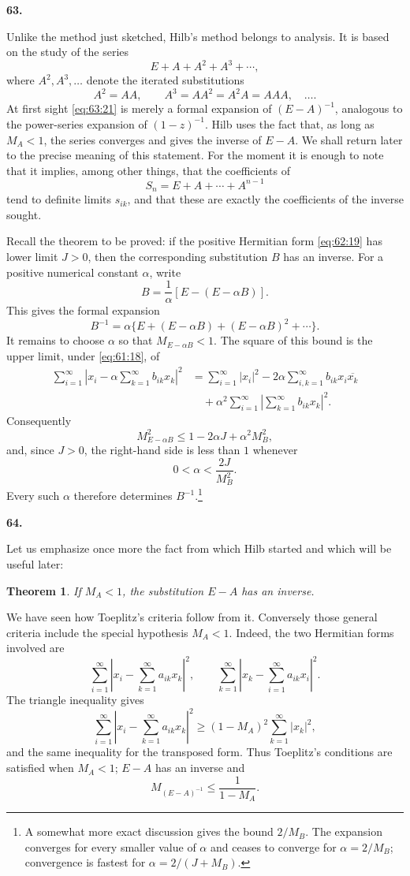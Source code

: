 \documentclass[
  paper=b5,
  fontsize=13pt,
  twoside=true,
  open=any,
  bookmarkpackage=false,
  chapterprefix=true,
  headings=normal
]{scrbook}
\newtheorem*{theorem}{Theorem}
\theoremstyle{definition}
\newcommand{\numberedparagraph}[1]{%
  \par\medskip\phantomsection\label{sec:#1}%
  \noindent\textbf{#1.}\enspace
}
\begin{document}
\numberedparagraph{63}
Unlike the method just sketched, Hilb's method belongs to analysis. It is
based on the study of the series
\begin{equation}
  E+A+A^2+A^3+\cdots,
  \tag{21}\label{eq:63:21}
\end{equation}
where $A^2,A^3,\ldots$ denote the iterated substitutions
\[
 A^2=AA,\qquad A^3=AA^2=A^2A=AAA,\quad\ldots.
\]
At first sight \eqref{eq:63:21} is merely a formal expansion of
$(E-A)^{-1}$, analogous to the power-series expansion of $(1-z)^{-1}$.
Hilb uses the fact that, as long as $M_A<1$, the series converges and gives
the inverse of $E-A$. We shall return later to the precise meaning of this
statement. For the moment it is enough to note that it implies, among other
things, that the coefficients of
\[
  S_n=E+A+\cdots+A^{n-1}
\]
tend to definite limits $s_{ik}$, and that these are exactly the
coefficients of the inverse sought.

Recall the theorem to be proved: if the positive Hermitian form
\eqref{eq:62:19} has lower limit $J>0$, then the corresponding substitution
$B$ has an inverse. For a positive numerical constant $\alpha$, write
\[
 B=\frac1\alpha[E-(E-\alpha B)].
\]
This gives the formal expansion
\[
 B^{-1}=\alpha\{E+(E-\alpha B)+(E-\alpha B)^2+\cdots\}.
\]
It remains to choose $\alpha$ so that $M_{E-\alpha B}<1$. The square of
this bound is the upper limit, under \eqref{eq:61:18}, of
\begin{align*}
 \sum_{i=1}^{\infty}\left|x_i-\alpha\sum_{k=1}^{\infty}b_{ik}x_k\right|^2
 &=\sum_{i=1}^{\infty}|x_i|^2
 -2\alpha\sum_{i,k=1}^{\infty}b_{ik}x_i\overline{x_k}\\
 &\quad+\alpha^2\sum_{i=1}^{\infty}
    \left|\sum_{k=1}^{\infty}b_{ik}x_k\right|^2.
\end{align*}
Consequently
\[
 M_{E-\alpha B}^2\leq1-2\alpha J+\alpha^2M_B^2,
\]
and, since $J>0$, the right-hand side is less than $1$ whenever
\[
 0<\alpha<\frac{2J}{M_B^2}.
\]
Every such $\alpha$ therefore determines $B^{-1}$.\footnote{A somewhat
more exact discussion gives the bound $2/M_B$. The expansion converges for
every smaller value of $\alpha$ and ceases to converge for
$\alpha=2/M_B$; convergence is fastest for
$\alpha=2/(J+M_B)$.}

\numberedparagraph{64}
Let us emphasize once more the fact from which Hilb started and which will
be useful later:
\begin{theorem}
If $M_A<1$, the substitution $E-A$ has an inverse.
\end{theorem}
We have seen how Toeplitz's criteria follow from it. Conversely those
general criteria include the special hypothesis $M_A<1$. Indeed, the two
Hermitian forms involved are
\[
 \sum_{i=1}^{\infty}
   \left|x_i-\sum_{k=1}^{\infty}a_{ik}x_k\right|^2,
 \qquad
 \sum_{k=1}^{\infty}
   \left|x_k-\sum_{i=1}^{\infty}a_{ik}x_i\right|^2.
\]
The triangle inequality gives
\[
 \sum_{i=1}^{\infty}
   \left|x_i-\sum_{k=1}^{\infty}a_{ik}x_k\right|^2
 \geq(1-M_A)^2\sum_{k=1}^{\infty}|x_k|^2,
\]
and the same inequality for the transposed form. Thus Toeplitz's conditions
are satisfied when $M_A<1$; $E-A$ has an inverse and
\[
  M_{(E-A)^{-1}}\leq\frac1{1-M_A}.
\]
\end{document}
